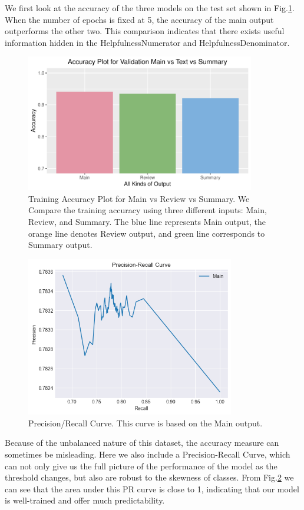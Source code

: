 \documentclass[letterpaper]{article} %
\begin{document}
We first look at the accuracy of the three models on the test set shown in Fig.\ref{1}. When the number of epochs is fixed at 5, the accuracy of the main output outperforms the other two. This comparison indicates that there exists useful information hidden in the HelpfulnessNumerator and HelpfulnessDenominator.

\begin{figure}[!h]
\centering
\includegraphics[height=6cm,width=0.9\columnwidth]{plot_val_acc.pdf}  
\caption{Training Accuracy Plot for Main vs Review vs Summary. We Compare the training accuracy using three different inputs: Main, Review, and Summary. The blue line represents Main output, the orange line denotes Review output, and green line corresponds to Summary output.}
\label{1}
\end{figure}


\begin{figure}[!h]
\centering
\includegraphics[height=7cm,width=0.9\columnwidth]{pr_curve.png}  
\caption{Precision/Recall Curve. This curve is based on the Main output.}
\label{3}
\end{figure}

Because of the unbalanced nature of this dataset, the accuracy measure can sometimes be misleading. Here we also include a Precision-Recall Curve, which can not only give us the full picture of the performance of the model as the threshold changes, but also are robust to the skewness of classes. From Fig.\ref{3} we can see that the area under this PR curve is close to 1, indicating that our model is well-trained and offer much predictability.
\end{document}
